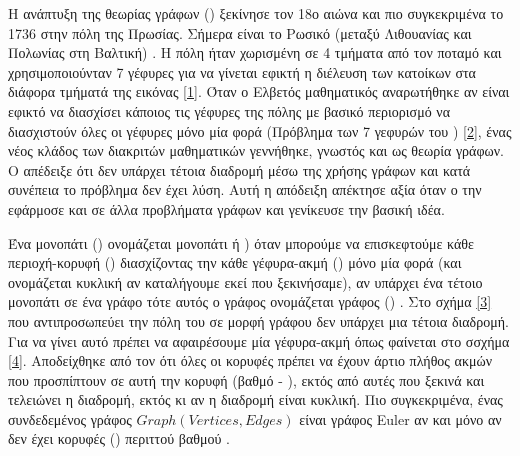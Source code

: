 Η ανάπτυξη της θεωρίας γράφων () ξεκίνησε τον 18ο αιώνα και πιο συγκεκριμένα το 1736 στην πόλη  της Πρωσίας. Σήμερα είναι το Ρωσικό  (μεταξύ Λιθουανίας και Πολωνίας στη Βαλτική) \cite{manwlopoulos2014thewria}. Η πόλη ήταν χωρισμένη σε 4 τμήματα από τον ποταμό  και χρησιμοποιούνταν 7 γέφυρες για να γίνεται εφικτή η διέλευση των κατοίκων στα διάφορα τμήματά της εικόνας \ref{1}. Όταν ο Ελβετός μαθηματικός  αναρωτήθηκε αν είναι εφικτό να διασχίσει κάποιος τις γέφυρες της πόλης με βασικό περιορισμό να διασχιστούν όλες οι γέφυρες μόνο μία φορά (Πρόβλημα των 7 γεφυρών του ) \ref{2}, ένας νέος κλάδος των διακριτών μαθηματικών γεννήθηκε, γνωστός και ως θεωρία γράφων. Ο  απέδειξε ότι δεν υπάρχει τέτοια διαδρομή μέσω της χρήσης γράφων  και κατά συνέπεια το πρόβλημα δεν έχει λύση. Αυτή η απόδειξη απέκτησε αξία όταν ο  την εφάρμοσε και σε άλλα προβλήματα γράφων και γενίκευσε την βασική ιδέα. 

Ένα μονοπάτι () ονομάζεται μονοπάτι  ή ) όταν μπορούμε να επισκεφτούμε κάθε περιοχή-κορυφή () διασχίζοντας την κάθε γέφυρα-ακμή () μόνο μία φορά (και ονομάζεται κυκλική αν καταλήγουμε εκεί που ξεκινήσαμε), αν υπάρχει ένα τέτοιο μονοπάτι σε ένα γράφο τότε αυτός ο γράφος ονομάζεται γράφος  () \cite{ntenisiwtis2023thewria}. Στο σχήμα \ref{3} που αντιπροσωπεύει την πόλη του  σε μορφή γράφου δεν υπάρχει μια τέτοια διαδρομή. Για να γίνει αυτό πρέπει να αφαιρέσουμε μία γέφυρα-ακμή όπως φαίνεται στο σσχήμα \ref{4}. Αποδείχθηκε από τον  ότι όλες οι κορυφές πρέπει να έχουν άρτιο πλήθος ακμών που προσπίπτουν σε αυτή την κορυφή (βαθμό - ), εκτός από αυτές  που ξεκινά και τελειώνει η διαδρομή, εκτός κι αν η διαδρομή είναι κυκλική. Πιο συγκεκριμένα, ένας συνδεδεμένος γράφος $Graph(Vertices,Edges)$ είναι γράφος Euler αν και μόνο αν δεν έχει κορυφές () περιττού βαθμού \cite{bondy1976usr}.